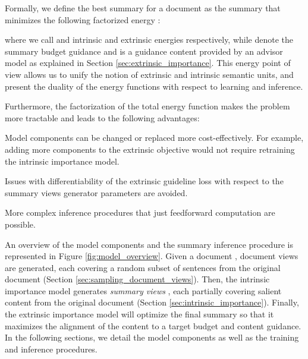 \documentclass[11pt,table]{article}
\newenvironment{itemizesquish}[2]{\begin{list}{\labelitemi}{\setlength{\itemsep}{#1}\setlength{\labelwidth}{#2}\setlength{\leftmargin}{\labelwidth}\addtolength{\leftmargin}{\labelsep}}}{\end{list}}
\begin{document}
Formally, we define the best summary  for a document  as the summary that minimizes the following factorized energy \citep{lecun2006tutorial}:

where we call  and  intrinsic and extrinsic energies respectively, while  denote the summary budget guidance and  is a guidance content provided by an advisor model as explained in Section \ref{sec:extrinsic_importance}. 
This energy point of view allows us to unify the notion of extrinsic and intrinsic semantic units, and present the duality of the energy functions with respect to learning and inference.

Furthermore, the factorization of the total energy function makes the problem more tractable and leads to the following advantages:
\begin{itemizesquish}{-0.3em}{0.5em}
    \item Model components can be changed or replaced more cost-effectively. For example, adding more components to the extrinsic objective would not require retraining the intrinsic importance model.
    \item Issues with differentiability of the extrinsic guideline loss with respect to the summary views generator parameters are avoided.
    \item More complex inference procedures that just feedforward computation are possible.
\end{itemizesquish}

An overview of the model components and the summary inference procedure is represented in Figure \ref{fig:model_overview}. Given a document ,  document views are generated, each covering a random subset of sentences from the original document (Section \ref{sec:sampling_document_views}). Then, the intrinsic importance model generates \emph{summary views} , each partially covering salient content from the original document  (Section \ref{sec:intrinsic_importance}). Finally, the extrinsic importance model will optimize the final summary  so that it maximizes the alignment of the content to a target budget and content guidance. In the following sections, we detail the model components as well as the training and inference procedures.
\end{document}
